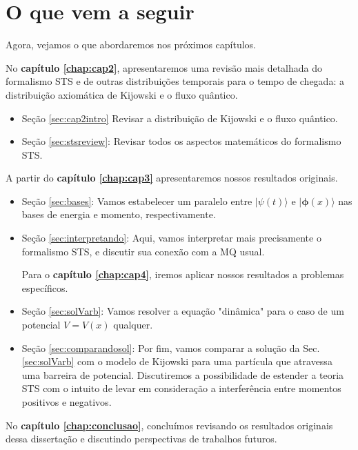 \section{O que vem a seguir}
\label{proxcaps}
Agora, vejamos o que abordaremos nos próximos capítulos.


No \textbf{capítulo \ref{chap:cap2}}, apresentaremos uma revisão mais detalhada do formalismo STS e de outras distribuições temporais para o tempo de chegada: a distribuição axiomática de Kijowski e o fluxo quântico.

\begin{itemize}
  \item Seção \ref{sec:cap2intro} Revisar a distribuição de Kijowski e o fluxo quântico.  
  \item Seção \ref{sec:stsreview}: Revisar todos os aspectos matemáticos do formalismo STS.
\end{itemize}



A partir do \textbf{capítulo \ref{chap:cap3}} apresentaremos nossos resultados originais.

\begin{itemize}
  \item Seção \ref{sec:bases}: Vamos estabelecer um paralelo entre $|\psi(t) \rangle$ e $|\pmb{\phi}(x)\rangle$ nas bases de energia e momento, respectivamente.
  \item Seção \ref{sec:interpretando}: Aqui, vamos interpretar mais precisamente o formalismo STS, e discutir sua conexão com a MQ usual.

Para o \textbf{capítulo \ref{chap:cap4}}, iremos aplicar nossos resultados a problemas específicos.
 
  \item Seção \ref{sec:solVarb}: Vamos resolver a equação "dinâmica" \text{ }para o caso de um potencial $V = V(x)$  qualquer.
  \item Seção \ref{sec:comparandosol}: Por fim, vamos comparar a solução da Sec. \ref{sec:solVarb} com o modelo de Kijowski para uma partícula que atravessa uma barreira de potencial. Discutiremos a possibilidade de estender a teoria STS com o intuito de levar em consideração a interferência entre momentos positivos e negativos. 
\end{itemize}

No \textbf{capítulo \ref{chap:conclusao}}, concluímos revisando os resultados originais dessa dissertação e discutindo perspectivas de trabalhos futuros. 
